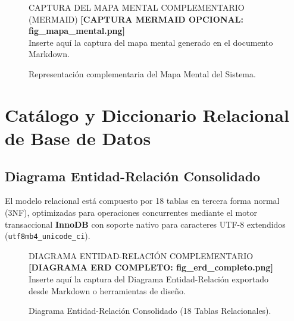 \documentclass[11pt,a4paper,openany]{report}
\begin{document}
\begin{figure}[H]
    \centering
    \begin{modernbox}{CAPTURA DEL MAPA MENTAL COMPLEMENTARIO (MERMAID)}
        \centering\vspace{0.8cm}
        \textbf{\color{slategray}[CAPTURA MERMAID OPCIONAL: fig\_mapa\_mental.png]}\\[0.15cm]
        \footnotesize Inserte aquí la captura del mapa mental generado en el documento Markdown.
        \vspace{0.8cm}
    \end{modernbox}
    \caption{Representación complementaria del Mapa Mental del Sistema.}
    \label{fig:mapa_mermaid}
\end{figure}

\chapter{Catálogo y Diccionario Relacional de Base de Datos}

\section{Diagrama Entidad-Relación Consolidado}

El modelo relacional está compuesto por 18 tablas en tercera forma normal (3NF), optimizadas para operaciones concurrentes mediante el motor transaccional \textbf{InnoDB} con soporte nativo para caracteres UTF-8 extendidos (\texttt{utf8mb4\_unicode\_ci}).

\begin{figure}[H]
    \centering
    \begin{modernbox}{DIAGRAMA ENTIDAD-RELACIÓN COMPLEMENTARIO}
        \centering\vspace{1.2cm}
        \textbf{\color{slategray}[DIAGRAMA ERD COMPLETO: fig\_erd\_completo.png]}\\[0.15cm]
        \footnotesize Inserte aquí la captura del Diagrama Entidad-Relación exportado desde Markdown o herramientas de diseño.
        \vspace{1.2cm}
    \end{modernbox}
    \caption{Diagrama Entidad-Relación Consolidado (18 Tablas Relacionales).}
    \label{fig:erd_placeholder}
\end{figure}
\end{document}
